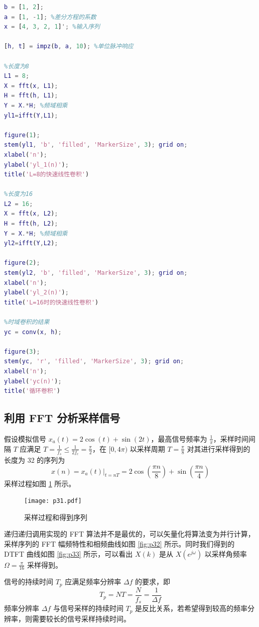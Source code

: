 \documentclass[12pt,AutoFakeBold]{article}
\begin{document}
\begin{lstlisting}[language=Matlab]
b = [1, 2];
a = [1, -1]; %差分方程的系数
x = [4, 3, 2, 1]'; %输入序列

[h, t] = impz(b, a, 10); %单位脉冲响应

%长度为8
L1 = 8;
X = fft(x, L1);
H = fft(h, L1);
Y = X.*H; %频域相乘
yl1=ifft(Y,L1);

figure(1);
stem(yl1, 'b', 'filled', 'MarkerSize', 3); grid on;
xlabel('n');
ylabel('yl_1(n)');
title('L=8的快速线性卷积')

%长度为16
L2 = 16;
X = fft(x, L2);
H = fft(h, L2);
Y = X.*H; %频域相乘
yl2=ifft(Y,L2);

figure(2);
stem(yl2, 'b', 'filled', 'MarkerSize', 3); grid on;
xlabel('n');
ylabel('yl_2(n)');
title('L=16时的快速线性卷积')

%时域卷积的结果
yc = conv(x, h);

figure(3);
stem(yc, 'r', 'filled', 'MarkerSize', 3); grid on;
xlabel('n');
ylabel('yc(n)');
title('循环卷积')
\end{lstlisting}

\subsection{利用 FFT 分析采样信号} \label{sec:p3}

假设模拟信号 $x_a(t)=2\cos(t)+\sin(2t)$，最高信号频率为 $\frac{1}{\pi}$，采样时间间隔 $T$ 应满足 $T=\frac{1}{f_s}\le\frac{1}{2f_c}=\frac{\pi}{2}$，在 $[0,4\pi)$ 以采样周期 $T=\frac{\pi}{8}$ 对其进行采样得到的长度为 32 的序列为
%
\begin{equation*}
x(n)=x_a(t)|_{t=nT}=2\cos(\frac{\pi n}{8})+\sin(\frac{\pi n}{4})
\end{equation*}
%
采样过程如图 \ref{fig:p31} 所示。

\begin{figure}[hbtp]
	\centering
	\texttt{[image: p31.pdf]}
	\caption{采样过程和得到序列} \label{fig:p31}
\end{figure}

递归递归调用实现的 FFT 算法并不是最优的，可以矢量化将算法变为并行计算，采样序列的 FFT 幅频特性和相频曲线如图 \ref{fig:p32} 所示。同时我们得到的 DTFT 曲线如图 \ref{fig:p33} 所示，可以看出 $X(k)$ 是从 $X(e^{j\omega})$ 以采样角频率 $\Omega=\frac{\pi}{16}$ 采样得到。

信号的持续时间 $T_p$ 应满足频率分辨率 $\Delta f$ 的要求，即
%
\begin{equation*}
T_p=NT=\frac{N}{f_s}=\frac{1}{\Delta f}
\end{equation*}
%
频率分辨率 $\Delta f$ 与信号采样的持续时间 $T_p$ 是反比关系，若希望得到较高的频率分辨率，则需要较长的信号采样持续时间。
\end{document}
